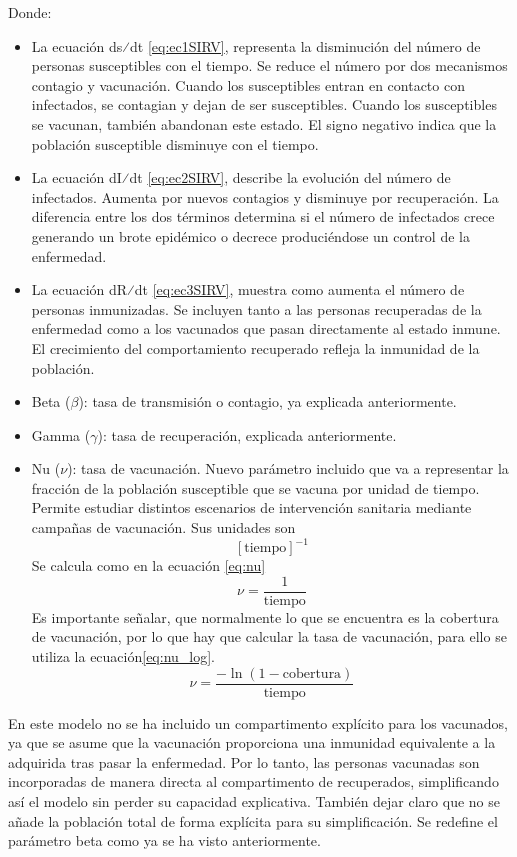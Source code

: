 Donde:
\begin{itemize}
    \item 	La ecuación ds⁄dt \eqref{eq:ec1SIRV}, representa la disminución del número de personas susceptibles con el tiempo. Se reduce el número por dos mecanismos contagio y vacunación. Cuando los susceptibles entran en contacto con infectados, se contagian y dejan de ser susceptibles. Cuando los susceptibles se vacunan, también abandonan este estado. El signo negativo indica que la población susceptible disminuye con el tiempo.
    \item 	La ecuación dI⁄dt \eqref{eq:ec2SIRV}, describe la evolución del número de infectados. Aumenta por nuevos contagios y disminuye por recuperación. La diferencia entre los dos términos determina si el número de infectados crece generando un brote epidémico o decrece produciéndose un control de la enfermedad.
    \item 	La ecuación dR⁄dt \eqref{eq:ec3SIRV}, muestra como aumenta el número de personas inmunizadas. Se incluyen tanto a las personas recuperadas de la enfermedad como a los vacunados que pasan directamente al estado inmune. El crecimiento del comportamiento recuperado refleja la inmunidad de la población.
    \item 	Beta ($\beta$): tasa de transmisión o contagio, ya explicada anteriormente.
    \item 	Gamma ($\gamma$): tasa de recuperación, explicada anteriormente.
    \item	Nu ($\nu$): tasa de vacunación. Nuevo parámetro incluido que va a representar la fracción de la población susceptible que se vacuna por unidad de tiempo. Permite estudiar distintos escenarios de intervención sanitaria mediante campañas de vacunación. Sus unidades son
\[
[\text{tiempo}]^{-1}
\]
Se calcula como en la ecuación \eqref{eq:nu}
\begin{equation}
\nu = \frac{1}{\text{tiempo}}
\label{eq:nu}
\end{equation}
Es importante señalar, que normalmente lo que se encuentra es la cobertura de vacunación, por lo que hay que calcular la tasa de vacunación, para ello se utiliza la ecuación\eqref{eq:nu_log}.
\begin{equation}
\nu = \frac{-\ln(1 - \text{cobertura})}{\text{tiempo}}
\label{eq:nu_log}
\end{equation}


\end{itemize}

En este modelo no se ha incluido un compartimento explícito para los vacunados, ya que se asume que la vacunación proporciona una inmunidad equivalente a la adquirida tras pasar la enfermedad. Por lo tanto, las personas vacunadas son incorporadas de manera directa al compartimento de recuperados, simplificando así el modelo sin perder su capacidad explicativa. También dejar claro que no se añade la población total de forma explícita para su simplificación. Se redefine el parámetro beta como ya se ha visto anteriormente.

